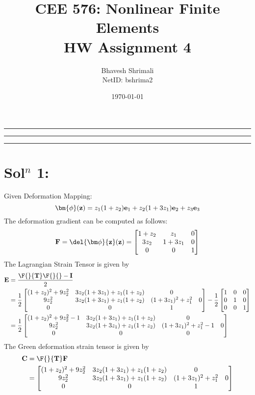 
\title{\bf CEE 576: Nonlinear Finite Elements \\ HW Assignment 4}
\author{Bhavesh Shrimali \\ NetID: bshrima2}
\date{\today}

\maketitle \hrule \hrule \hrule
\section*{Sol$^n$ 1: }
Given Deformation Mapping: 
\[
\bm{\phi}({\bf z})
=
z_1(1+z_2){\bf e}_1
+ z_2(1+3z_1){\bf e}_2
+ z_3{\bf e}_3
\]
The deformation gradient can be computed as follows:
\begin{align*}
{\bf F}
=
\del{\bm\phi}{\bf z}({\bf z})=
\begin{bmatrix}
1+z_2 & z_1 & 0\\
3z_2 & 1+3z_1 & 0\\
0 & 0 & 1
\end{bmatrix}
\end{align*}
The Lagrangian Strain Tensor is given by
\begin{align*}
{\bf E}
& =
\frac{\bf \F{}{T}\F{}{}-I}{2} \\
& = \frac{1}{2}
\begin{bmatrix}
(1+z_2)^2 + 9z^2_2 & 3z_2(1+3z_1)+z_1(1+z_2) & 0\\
9z^2_2 & 3z_2(1+3z_1)+z_1(1+z_2) & (1+3z_1)^2 + z_1^2 & 0\\
0 & 0 & 1
\end{bmatrix}-\frac{1}{2}
\begin{bmatrix}
1 & 0 & 0 \\
0 & 1 & 0\\
0 & 0 & 1
\end{bmatrix}\\
& = 
\frac{1}{2}
\begin{bmatrix}
(1+z_2)^2 + 9z^2_2 -1 & 3z_2(1+3z_1)+z_1(1+z_2) & 0\\
9z^2_2 & 3z_2(1+3z_1)+z_1(1+z_2) & (1+3z_1)^2 + z_1^2 - 1 & 0\\
0 & 0 & 0
\end{bmatrix}
\end{align*}
The Green deformation strain tensor is given by
\begin{align*}
{\bf C}
& = {\bf \F{}{T} F}\\
& = \begin{bmatrix}
(1+z_2)^2 + 9z^2_2 & 3z_2(1+3z_1)+z_1(1+z_2) & 0\\
9z^2_2 & 3z_2(1+3z_1)+z_1(1+z_2) & (1+3z_1)^2 + z_1^2 & 0\\
0 & 0 & 1
\end{bmatrix}
\end{align*}

